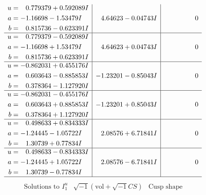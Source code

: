 \documentclass[1p]{elsarticle_modified}
\theoremstyle{definition}
\newcommand{\I}{\sqrt{-1}}
\begin{document}
$$\begin{array}{c|c|c}
\begin{aligned}
u &= \phantom{-}0.779379 + 0.592089 I \\
a &= -1.16698 - 1.53479 I \\
b &= \phantom{-}0.815736 - 0.623391 I\end{aligned}
 & \phantom{-}4.64623 - 0.04743 I & \phantom{-0.000000 } 0 \\ \hline\begin{aligned}
u &= \phantom{-}0.779379 - 0.592089 I \\
a &= -1.16698 + 1.53479 I \\
b &= \phantom{-}0.815736 + 0.623391 I\end{aligned}
 & \phantom{-}4.64623 + 0.04743 I & \phantom{-0.000000 } 0 \\ \hline\begin{aligned}
u &= -0.862031 + 0.455176 I \\
a &= \phantom{-}0.603643 - 0.885853 I \\
b &= \phantom{-}0.378364 - 1.127920 I\end{aligned}
 & -1.23201 - 0.85043 I & \phantom{-0.000000 } 0 \\ \hline\begin{aligned}
u &= -0.862031 - 0.455176 I \\
a &= \phantom{-}0.603643 + 0.885853 I \\
b &= \phantom{-}0.378364 + 1.127920 I\end{aligned}
 & -1.23201 + 0.85043 I & \phantom{-0.000000 } 0 \\ \hline\begin{aligned}
u &= \phantom{-}0.498633 + 0.834333 I \\
a &= -1.24445 - 1.05722 I \\
b &= \phantom{-}1.30739 + 0.77834 I\end{aligned}
 & \phantom{-}2.08576 + 6.71841 I & \phantom{-0.000000 } 0 \\ \hline\begin{aligned}
u &= \phantom{-}0.498633 - 0.834333 I \\
a &= -1.24445 + 1.05722 I \\
b &= \phantom{-}1.30739 - 0.77834 I\end{aligned}
 & \phantom{-}2.08576 - 6.71841 I & \phantom{-0.000000 } 0\\
 \hline 
 \end{array}$$\newpage$$\begin{array}{c|c|c}  
\text{Solutions to }I^u_{1}& \I (\text{vol} + \sqrt{-1}CS) & \text{Cusp shape}\\

\end{array}$$
\end{document}
